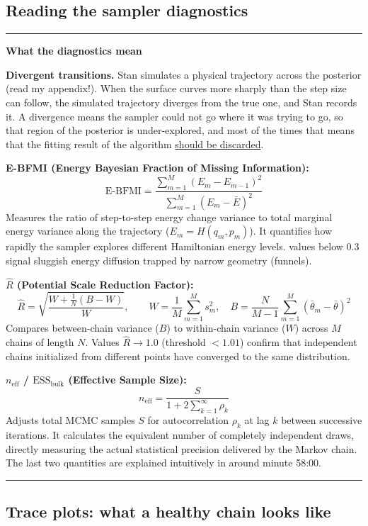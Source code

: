 \documentclass[11pt,a4paper]{article}
\newenvironment{infobox}[1]{%
  \par\vspace{6pt}\begin{center}\begin{minipage}{0.96\textwidth}%
  \rule{\linewidth}{0.8pt}\vspace{3pt}\par
  \textbf{#1}\par\vspace{4pt}\small
}{%
  \par\vspace{3pt}\rule{\linewidth}{0.8pt}%
  \end{minipage}\end{center}\vspace{6pt}\par
}
\begin{document}
\subsection{Reading the sampler diagnostics}

\begin{infobox}{What the diagnostics mean}
\textbf{Divergent transitions.} Stan simulates a physical trajectory across the
posterior (read my appendix!). When the surface curves more sharply than the step size can follow,
the simulated trajectory diverges from the true one, and Stan records it. A
divergence means the sampler could not go where it was trying to go, so that
region of the posterior is under-explored, and most of the times that means that the fitting result of the algorithm \underline{should be discarded}.

\smallskip
\textbf{E-BFMI (Energy Bayesian Fraction of Missing Information):}
\[
  \text{E-BFMI} = \frac{\sum_{m=1}^{M} (E_m - E_{m-1})^2}{\sum_{m=1}^{M} (E_m - \bar{E})^2}
\]
Measures the ratio of step-to-step energy change variance to total marginal energy variance along the trajectory ($E_m = H(q_m, p_m)$). It quantifies how rapidly the sampler explores different Hamiltonian energy levels. values below $0.3$ signal sluggish energy diffusion trapped by narrow geometry (funnels).

\smallskip
\textbf{$\hat{R}$ (Potential Scale Reduction Factor):}
\[
  \hat{R} = \sqrt{\frac{W + \frac{1}{N}(B - W)}{W}}, \qquad W = \frac{1}{M}\sum_{m=1}^M s_m^2, \quad B = \frac{N}{M-1}\sum_{m=1}^M (\bar{\theta}_m - \bar{\theta})^2
\]
Compares between-chain variance ($B$) to within-chain variance ($W$) across $M$ chains of length $N$. Values $\hat{R} \to 1.0$ (threshold $<1.01$) confirm that independent chains initialized from different points have converged to the same distribution.

\smallskip
\textbf{$n_{\text{eff}}$ / $\text{ESS}_{\text{bulk}}$ (Effective Sample Size):}
\[
  n_{\text{eff}} = \frac{S}{1 + 2 \sum_{k=1}^{\infty} \rho_k}
\]
Adjusts total MCMC samples $S$ for autocorrelation $\rho_k$ at lag $k$ between successive iterations. It calculates the equivalent number of completely independent draws, directly measuring the actual statistical precision delivered by the Markov chain. The last two quantities are explained intuitively in \cite{mcelreath2023_lecture09} around minute 58:00.
\end{infobox}

\subsection{Trace plots: what a healthy chain looks like}
\end{document}
